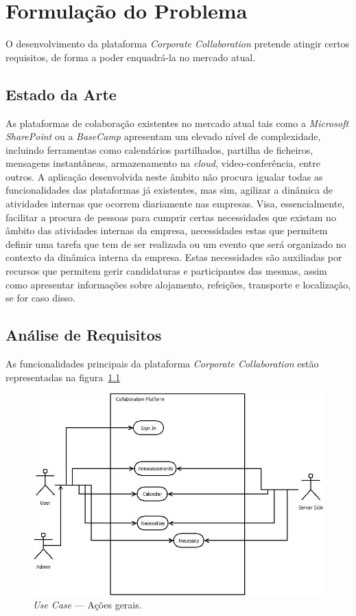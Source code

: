 \chapter{Formulação do Problema}\label{chapter:formulacaoDoProblema}

O desenvolvimento da plataforma \textit{Corporate Collaboration} pretende atingir certos requisitos, de forma a poder enquadrá-la no mercado 
atual. 


\section{Estado da Arte}\label{sec:estadoDaArte}
As plataformas de colaboração existentes no mercado atual tais como a \textit{Microsoft SharePoint} ou a \textit{BaseCamp} apresentam um elevado nível de complexidade, 
incluindo ferramentas como calendários partilhados, partilha de ficheiros, mensagens instantâneas, armazenamento na \textit{cloud}, video-conferência, entre outros. 
A aplicação desenvolvida neste âmbito não procura igualar todas as funcionalidades das plataformas já existentes, 
mas sim, agilizar a dinâmica de atividades internas que ocorrem diariamente nas empresas. 
Visa, essencialmente, facilitar a procura de pessoas para cumprir certas necessidades que existam no âmbito das atividades internas da empresa, 
necessidades estas que permitem definir uma tarefa que tem de ser realizada ou um evento que será organizado no contexto da dinâmica interna da empresa. 
Estas necessidades são auxiliadas por recursos que permitem gerir candidaturas e participantes das mesmas, 
assim como apresentar informações sobre alojamento, refeições, transporte e localização, se for caso disso.

\section{Análise de Requisitos}\label{sec:requisitos}

As funcionalidades principais da plataforma \textit{Corporate Collaboration} estão representadas na figura~\ref{fig:uc:generalActions}

\begin{figure}[H]
    \centering
    \includegraphics[scale=0.6]{figures/General Actions.jpeg}
    \caption{\textit{Use Case} --- Ações gerais.}\label{fig:uc:generalActions}
\end{figure}

